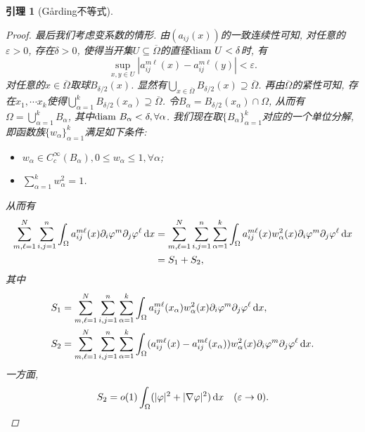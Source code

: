 \documentclass[12pt,a4paper]{article}
\newtheorem{lemma}[theorem]{引理}
\begin{document}
\begin{lemma}[G\r arding不等式]
\begin{proof}
        最后我们考虑变系数的情形. 由$(a_{ij}(x))$的一致连续性可知, 对任意的$\varepsilon > 0$, 存在$\delta > 0$, 使得当开集$U \subseteq \overline{\Omega}$的直径${\rm diam}\ U < \delta$时, 有
        \begin{equation*}
            \sup_{x, y \in U}|a_{ij}^{m\ell}(x) - a_{ij}^{m\ell}(y)| < \varepsilon.
        \end{equation*}
        对任意的$x \in \overline{\Omega}$取球$B_{\delta/2}(x)$. 显然有$\bigcup_{x \in \overline{\Omega}}B_{\delta/2}(x) \supseteq \overline{\Omega}$.
        再由$\overline{\Omega}$的紧性可知, 存在$x_1, \cdots x_k$使得$\bigcup_{\alpha = 1}^kB_{\delta/2}(x_{\alpha}) \supseteq \overline{\Omega}$.
        令$B_{\alpha} = B_{\delta/2}(x_{\alpha}) \cap \Omega$, 从而有$\Omega = \bigcup_{\alpha = 1}^kB_{\alpha}$, 其中${\rm diam}\ B_{\alpha} < \delta, \forall \alpha$.
        我们现在取$\{B_{\alpha}\}_{\alpha = 1}^k$对应的一个单位分解, 即函数族$\{w_{\alpha}\}_{\alpha = 1}^k$满足如下条件:
        \begin{itemize}
            \item $w_{\alpha} \in C_c^{\infty}(B_{\alpha}), 0 \leq w_{\alpha} \leq 1, \forall \alpha$;
            \item $\sum_{\alpha = 1}^kw_{\alpha}^2 = 1$.
        \end{itemize}
        从而有 
        \begin{align*}
            \sum_{m, \ell = 1}^N\sum_{i, j = 1}^n\int_{\Omega}a_{ij}^{m\ell}(x)\partial_i\varphi^m\partial_j\varphi^\ell \,{\rm d}x &= \sum_{m, \ell = 1}^N\sum_{i, j = 1}^n\sum_{\alpha = 1}^k\int_{\Omega}a_{ij}^{m\ell}(x)w_{\alpha}^2(x)\partial_i\varphi^m\partial_j\varphi^\ell \,{\rm d}x \\ 
            &= S_1 + S_2,
        \end{align*}
        其中 
        \begin{align*}
            S_1 &=  \sum_{m, \ell = 1}^N\sum_{i, j = 1}^n\sum_{\alpha = 1}^k\int_{\Omega}a_{ij}^{m\ell}(x_{\alpha})w_{\alpha}^2(x)\partial_i\varphi^m\partial_j\varphi^\ell \,{\rm d}x, \\ 
            S_2 &=  \sum_{m, \ell = 1}^N\sum_{i, j = 1}^n\sum_{\alpha = 1}^k\int_{\Omega}(a_{ij}^{m\ell}(x) - a_{ij}^{m\ell}(x_{\alpha}))w_{\alpha}^2(x)\partial_i\varphi^m\partial_j\varphi^\ell \,{\rm d}x.
        \end{align*}
        一方面, 
        \begin{equation*}
            S_2 = o(1)\int_{\Omega}(|\varphi|^2 + |\nabla\varphi|^2) \,{\rm d}x \quad (\varepsilon \rightarrow 0).

\end{equation*}
\end{proof}
\end{lemma}
\end{document}
